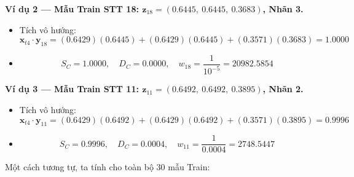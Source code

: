 \documentclass[12pt,a4paper]{article}
\begin{document}
\textbf{Ví dụ 2 — Mẫu Train STT 18: $\mathbf{z}_{18} = (0.6445,\ 0.6445,\ 0.3683)$, Nhãn 3.}
\begin{itemize}
    \item Tích vô hướng:
    \[
        \mathbf{x}_{t4} \cdot \mathbf{y}_{18}
        = (0.6429)(0.6445) + (0.6429)(0.6445) + (0.3571)(0.3683) = 1.0000
    \]
    \item
    \[
        S_C = 1.0000, \quad D_C = 0.0000, \quad
        w_{18} = \frac{1}{10^{-5}} = 20982.5854
    \]
\end{itemize}
 
\textbf{Ví dụ 3 — Mẫu Train STT 11: $\mathbf{z}_{11} = (0.6492,\ 0.6492,\ 0.3895)$, Nhãn 2.}
\begin{itemize}
    \item Tích vô hướng:
    \[
        \mathbf{x}_{t4} \cdot \mathbf{y}_{11}
        = (0.6429)(0.6492) + (0.6429)(0.6492) + (0.3571)(0.3895) = 0.9996
    \]
    \item
    \[
        S_C = 0.9996, \quad D_C = 0.0004, \quad
        w_{11} = \frac{1}{0.0004} = 2748.5447
    \]
\end{itemize}
 
Một cách tương tự, ta tính cho toàn bộ 30 mẫu Train:
 
\end{document}
